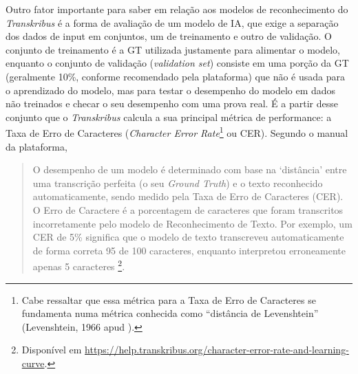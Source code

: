 \documentclass[portuguese]{textolivre}
\begin{document}
Outro fator importante para saber em relação aos modelos de reconhecimento do \textit{Transkribus} é a forma de avaliação de um modelo de IA, que exige a separação dos dados de input em conjuntos, um de treinamento e outro de validação. O conjunto de treinamento é a GT utilizada justamente para alimentar o modelo, enquanto o conjunto de validação (\textit{validation set}) consiste em uma porção da GT (geralmente 10\%, conforme recomendado pela plataforma) que não é usada para o aprendizado do modelo, mas para testar o desempenho do modelo em dados não treinados e checar o seu desempenho com uma prova real. É a partir desse conjunto que o \textit{Transkribus} calcula a sua principal métrica de performance: a Taxa de Erro de Caracteres (\textit{Character Error Rate}\footnote{Cabe ressaltar que essa métrica para a Taxa de Erro de Caracteres se fundamenta numa métrica conhecida como “distância de Levenshtein” (Levenshtein, 1966 apud \textcite[p.~22]{wang2021object}).} ou CER). Segundo o manual da plataforma,

\begin{quote}
    O desempenho de um modelo é determinado com base na ‘distância’ entre uma transcrição perfeita (o seu \textit{Ground Truth}) e o texto reconhecido automaticamente, sendo medido pela Taxa de Erro de Caracteres (CER). O Erro de Caractere é a porcentagem de caracteres que foram transcritos incorretamente pelo modelo de Reconhecimento de Texto. Por exemplo, um CER de 5\% significa que o modelo de texto transcreveu automaticamente de forma correta 95 de 100 caracteres, enquanto interpretou erroneamente apenas 5 caracteres \cite[tradução própria]{readcoop2025charactererror}\footnote{Disponível em \url{https://help.transkribus.org/character-error-rate-and-learning-curve}.}.
\end{quote}
\end{document}
